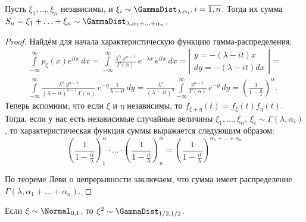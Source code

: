 \begin{lem}
    Пусть $\xi_{1}, \ldots, \xi_{n}$ независимы, и $\xi_i \sim \GammaDist_{\lambda, \alpha_i}, i=\overline{1,n}$. 
    Тогда их сумма $S_{n}=\xi_{1}+\ldots+\xi_{n} \sim \GammaDist_{\lambda, \alpha_1 + \ldots + \alpha_n}$.
\end{lem}
\begin{proof}
    Найдём для начала характеристическую функцию гамма-распределения:
    \begin{multline*}
        \int\limits_{-\infty}^{\infty} p_{\xi}(x) e^{itx} \, dx = 
        \int\limits_{-\infty}^{\infty} \frac{\lambda^\alpha \, x^{\alpha - 1}}{\Gamma(\alpha)} \, e^{-\lambda x}\, e^{itx} \,dx = 
        \left| \begin{array}{c}
            y  = -(\lambda - it)x \\
            dy = -(\lambda - it)dx
        \end{array} \right| = \\
        \int\limits_{-\infty}^{\infty} \frac{\lambda^\alpha \, y^{\alpha - 1}}{(\lambda - it)^{\alpha - 1} \, \Gamma(\alpha)} \, e^{-y} \frac{1}{\lambda - it} \,dy = 
        \frac{\lambda^\alpha}{(\lambda - it)^{\alpha}} \int\limits_{-\infty}^{\infty} \frac{y^{\alpha - 1}}{\Gamma(\alpha)} \, e^{-y} \, dy = 
        \left(\frac{1}{1 - \frac{it}{\lambda}} \right)^\alpha \!.
    \end{multline*}
    Теперь вспомним, что если $\xi$ и $\eta$ независимы, то $f_{\xi + \eta}(t) = f_{\xi}(t) f_{\eta}(t)$.
    Тогда, если у нас есть независимые случайные величины $\xi_1, \ldots, \xi_n, \: \xi_i \sim \Gamma(\lambda, \alpha_i)$, 
    то характеристическая функция суммы выражается следующим образом:
    \begin{equation*}
        \left(\frac{1}{1 - \frac{it}{\lambda}} \right)^\alpha_1 \cdot \ldots \cdot \left(\frac{1}{1 - \frac{it}{\lambda}} \right)^\alpha_n = 
        \left(\frac{1}{1 - \frac{it}{\lambda}} \right)^{\alpha_1 + \ldots + \alpha_n}
    \end{equation*}

    По теореме Леви о непрерывности заключаем, что сумма имеет распределение $\Gamma(\lambda, \alpha_1 + \ldots + \alpha_n)$.
\end{proof}

\begin{lem}
    Если $\xi \sim \Normal_{0,1}$, то $\xi^2 \sim \GammaDist_{1/2, 1/2}$.
\end{lem}

